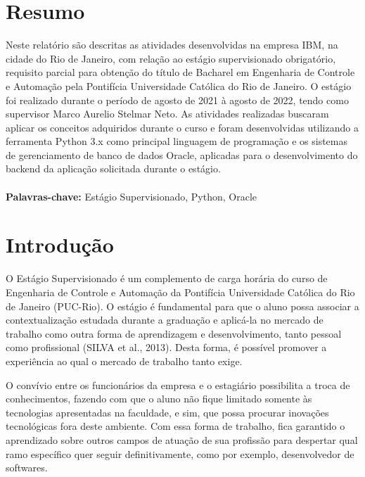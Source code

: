 \documentclass[english,brazil,oneside]{ifestagio}
\begin{document}
\maketitle

\chapter{Resumo}
Neste relatório são descritas as atividades desenvolvidas na empresa IBM, na cidade do Rio de Janeiro, com relação ao estágio
supervisionado obrigatório, requisito parcial para obtenção do título de Bacharel em
Engenharia de Controle e Automação pela Pontifícia Universidade Católica do Rio de Janeiro. O
estágio foi realizado durante o período de agosto de 2021 à agosto de 2022, tendo como
supervisor Marco Aurelio Stelmar Neto. As
atividades realizadas buscaram aplicar os conceitos adquiridos durante o curso e foram
desenvolvidas utilizando a ferramenta Python 3.x como principal linguagem de programação e os sistemas de gerenciamento de banco de dados Oracle, aplicadas para o desenvolvimento do backend da aplicação solicitada durante o estágio.\\ \\

\textbf{Palavras-chave:} Estágio Supervisionado, Python, Oracle

\newpage
\chapter{Introdução} \label{cap:introducao}

O Estágio Supervisionado é um complemento de carga horária do curso de Engenharia
de Controle e Automação da Pontifícia Universidade Católica do Rio de Janeiro (PUC-Rio). O estágio é fundamental para que o aluno possa associar a contextualização estudada durante a graduação e aplicá-la no mercado de trabalho como outra forma de aprendizagem e desenvolvimento, tanto pessoal como profissional (SILVA et al., 2013). Desta forma, é possível promover a experiência ao qual o mercado de trabalho tanto exige.

O convívio entre os funcionários da empresa e o
estagiário possibilita a troca de conhecimentos, fazendo com que o aluno não fique limitado somente às tecnologias apresentadas na faculdade, e sim, que possa procurar inovações
tecnológicas fora deste ambiente. Com essa forma de trabalho, fica garantido o aprendizado
sobre outros campos de atuação de sua profissão para despertar qual ramo específico quer
seguir definitivamente, como por exemplo, desenvolvedor de softwares.
\end{document}
